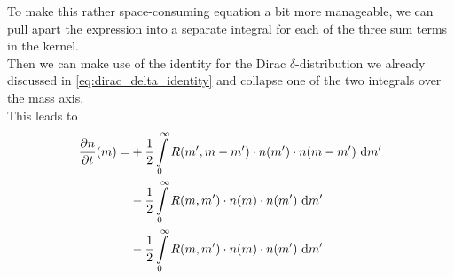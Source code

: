     To make this rather space-consuming equation a bit more manageable, we can pull apart the
    expression into a separate integral for each of the three sum terms in the kernel. \\

    Then we can make use of the identity for the Dirac $\delta$-distribution we already discussed
    in \cref{eq:dirac_delta_identity} and collapse one of the two integrals over the mass axis. \\

    \clearpage
    This leads to
    \begin{align}
        \frac{\partial n}{\partial t}(m)
            = &
                +\frac{1}{2} \int\limits_0^\infty
                R(m', m-m') 
                \cdot n(m')
                \cdot n(m-m')
                \ \text{d} m'
            \\ &
                -\frac{1}{2} \int\limits_0^\infty
                R(m, m') 
                \cdot n(m)
                \cdot n(m')
                \ \text{d} m'
            \\ &
                -\frac{1}{2} \int\limits_0^\infty
                R(m, m') 
                \cdot n(m)
                \cdot n(m')
                \ \text{d} m'
    \end{align}

